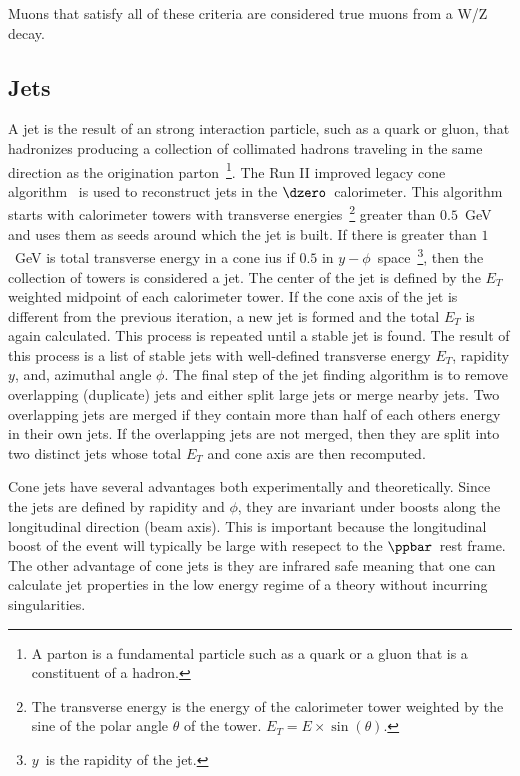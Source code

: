 Muons that satisfy all of these criteria are considered true muons from a W/Z decay.


\subsection{Jets}
\label{jetreco}
A jet is the result of an strong interaction particle, such as a quark or gluon, that hadronizes producing a collection of collimated hadrons traveling in the same direction as the origination parton~\footnote{A parton is a fundamental particle such as a quark or a gluon that is a constituent of a hadron.}. The Run II improved legacy cone algorithm~\cite{Blazey:2000qt} is used to reconstruct jets in the $\dzero$~calorimeter. This algorithm starts with calorimeter towers with transverse energies~\footnote{The transverse energy is the energy of the calorimeter tower weighted by the sine of the polar angle $\theta$ of the tower. $E_{T} = E \times \sin(\theta)$.} greater than $0.5$~GeV and uses them as seeds around which the jet is built. If there is greater than $1$~GeV is total transverse energy in a cone ius if $0.5$ in $y-\phi$~space~\footnote{$y$~is the rapidity of the jet.}, then the collection of towers is considered a jet. The center of the jet is defined by the $E_{T}$ weighted midpoint of each calorimeter tower. If the cone axis of the jet is different from the previous iteration, a new jet is formed and the total $E_{T}$ is again calculated. This process is repeated until a stable jet is found. The result of this process is a list of stable jets with well-defined transverse energy $E_{T}$, rapidity $y$, and, azimuthal angle $\phi$. The final step of the jet finding algorithm is to remove overlapping (duplicate) jets and either split large jets or merge nearby jets. Two overlapping jets are merged if they contain more than half of each others energy in their own jets. If the overlapping jets are not merged, then they are split into two distinct jets whose total $E_{T}$ and cone axis are then recomputed.

Cone jets have several advantages both experimentally and theoretically. Since the jets are defined by rapidity and $\phi$, they are invariant under boosts along the longitudinal direction (beam axis). This is important because the longitudinal boost of the event will typically be large with resepect to the $\ppbar$~rest frame. The other advantage of cone jets is they are infrared safe meaning that one can calculate jet properties in the low energy regime of a theory without incurring singularities.

